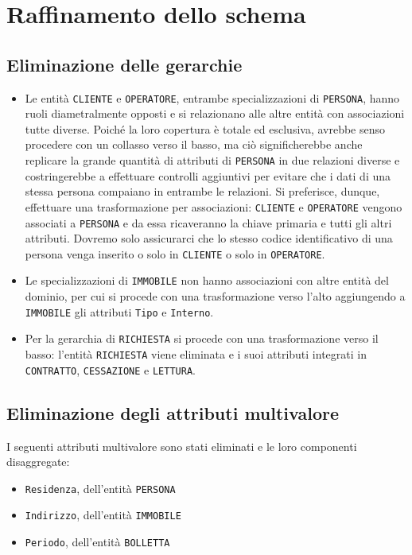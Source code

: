 \documentclass[a4paper,12pt]{report}
\begin{document}
\section{Raffinamento dello schema}
\subsection{Eliminazione delle gerarchie}
\begin{itemize}
    \item Le entità \texttt{CLIENTE} e \texttt{OPERATORE}, entrambe specializzazioni di \texttt{PERSONA}, hanno ruoli diametralmente opposti e si relazionano alle altre entità con associazioni tutte diverse. Poiché la loro copertura è totale ed esclusiva, avrebbe senso procedere con un collasso verso il basso, ma ciò significherebbe anche replicare la grande quantità di attributi di \texttt{PERSONA} in due relazioni diverse e costringerebbe a effettuare controlli aggiuntivi per evitare che i dati di una stessa persona compaiano in entrambe le relazioni. Si preferisce, dunque, effettuare una trasformazione per associazioni: \texttt{CLIENTE} e \texttt{OPERATORE} vengono associati a \texttt{PERSONA} e da essa ricaveranno la chiave primaria e tutti gli altri attributi. Dovremo solo assicurarci che lo stesso codice identificativo di una persona venga inserito o solo in \texttt{CLIENTE} o solo in \texttt{OPERATORE}.
    \item Le specializzazioni di \texttt{IMMOBILE} non hanno associazioni con altre entità del dominio, per cui si procede con una trasformazione verso l'alto aggiungendo a \texttt{IMMOBILE} gli attributi \texttt{Tipo} e \texttt{Interno}.
    \item Per la gerarchia di \texttt{RICHIESTA} si procede con una trasformazione verso il basso: l'entità \texttt{RICHIESTA} viene eliminata e i suoi attributi integrati in \texttt{CONTRATTO}, \texttt{CESSAZIONE} e \texttt{LETTURA}.
\end{itemize}

\subsection{Eliminazione degli attributi multivalore}
I seguenti attributi multivalore sono stati eliminati e le loro componenti disaggregate:
\begin{itemize}
    \item \texttt{Residenza}, dell'entità \texttt{PERSONA}
    \item \texttt{Indirizzo}, dell'entità \texttt{IMMOBILE}
    \item \texttt{Periodo}, dell'entità \texttt{BOLLETTA}
\end{itemize}
\end{document}
